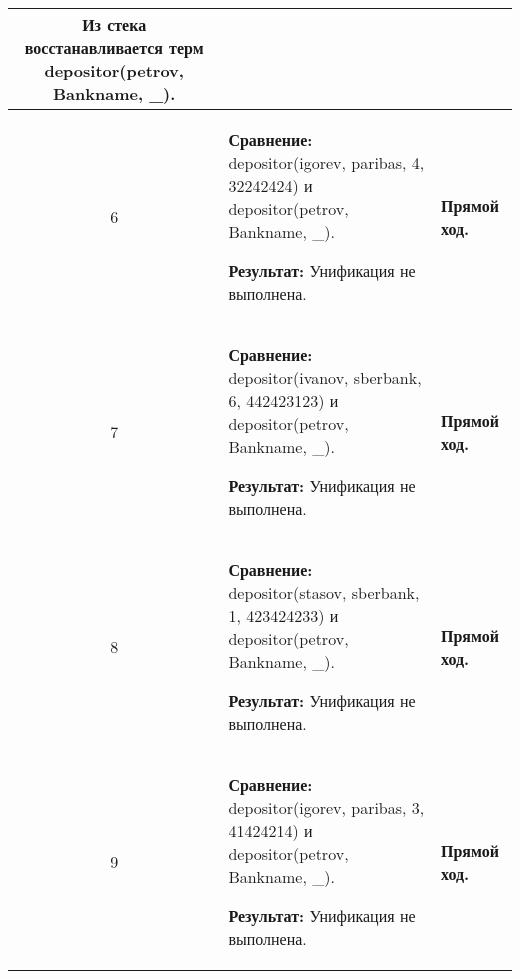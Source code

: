 \begin{longtable}{|c|p{}|p{}|}
    Из стека восстанавливается терм \newline
    depositor(petrov, Bankname, \_).
                       \\ \hline

    6
                       &
\textbf{Сравнение:} \newline
    depositor(igorev, paribas,  4, 32242424)
    \newline и \newline
    depositor(petrov, Bankname, \_).
    \newline

    \textbf{Результат:} \newline
    Унификация не выполнена.
                       &
    \textbf{Прямой ход.}
                       \\ \hline

    7
                       &
\textbf{Сравнение:} \newline
    depositor(ivanov, sberbank, 6, 442423123)
    \newline и \newline
    depositor(petrov, Bankname, \_).
    \newline

    \textbf{Результат:} \newline
    Унификация не выполнена.
                       &
    \textbf{Прямой ход.}
                       \\ \hline

    8
                       &
\textbf{Сравнение:} \newline
    depositor(stasov, sberbank, 1, 423424233)
    \newline и \newline
    depositor(petrov, Bankname, \_).
    \newline

    \textbf{Результат:} \newline
    Унификация не выполнена.
                       &
    \textbf{Прямой ход.}
                       \\ \hline

    9
                       &
\textbf{Сравнение:} \newline
    depositor(igorev, paribas,  3, 41424214)
    \newline и \newline
    depositor(petrov, Bankname, \_).
    \newline

    \textbf{Результат:} \newline
    Унификация не выполнена.
                       &
    \textbf{Прямой ход.}
                       \\ \hline


\end{longtable}
